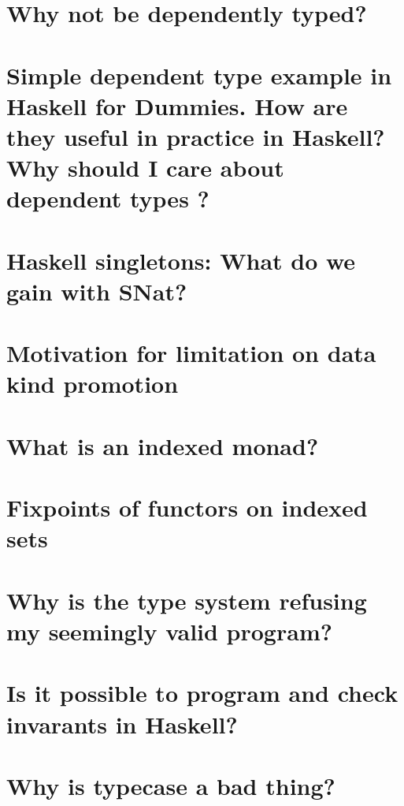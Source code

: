 \documentclass{book}%
\begin{document}
\section{Why not be dependently typed?}


\section{Simple dependent type example in Haskell for Dummies. How are they useful in practice in Haskell? Why should I care about dependent types ?}


\section{Haskell singletons: What do we gain with SNat?}


\section{Motivation for limitation on data kind promotion}


\section{What is an indexed monad?}


\section{Fixpoints of functors on indexed sets}


\section{Why is the type system refusing my seemingly valid program?}


\section{Is it possible to program and check invarants in Haskell?}


\section{Why is typecase a bad thing?}

\end{document}
